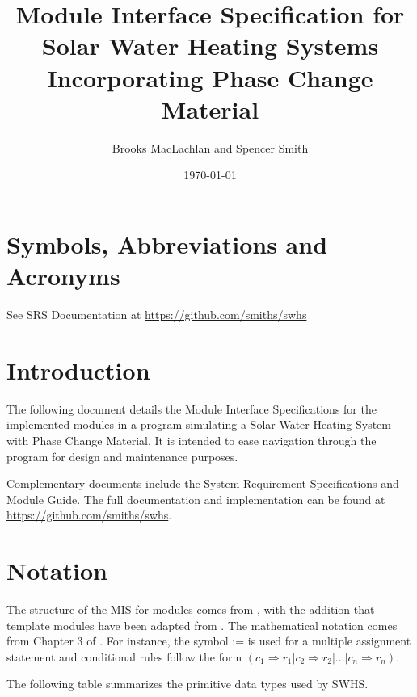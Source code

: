 \documentclass[12pt, titlepage]{article}
\newcommand{\progname}{SWHS}
\begin{document}
\title{Module Interface Specification for Solar Water Heating Systems
  Incorporating Phase Change Material}

\author{Brooks MacLachlan and Spencer Smith}

\date{\today}

\maketitle


\section{Symbols, Abbreviations and Acronyms}

See SRS Documentation at \url{https://github.com/smiths/swhs}

\newpage

\tableofcontents

\newpage


\section{Introduction}

The following document details the Module Interface Specifications for the
implemented modules in a program simulating a Solar Water Heating System with
Phase Change Material.  It is intended to ease navigation through the program
for design and maintenance purposes.

Complementary documents include the System Requirement Specifications
and Module Guide.  The full documentation and implementation can be
found at \url{https://github.com/smiths/swhs}.

\section{Notation}

The structure of the MIS for modules comes from \citet{HoffmanAndStrooper1995},
with the addition that template modules have been adapted from
\cite{GhezziEtAl2003}.  The mathematical notation comes from Chapter 3 of
\citet{HoffmanAndStrooper1995}.  For instance, the symbol := is used for a
multiple assignment statement and conditional rules follow the form $(c_1
\Rightarrow r_1 | c_2 \Rightarrow r_2 | ... | c_n \Rightarrow r_n )$.

The following table summarizes the primitive data types used by \progname. 
\end{document}

